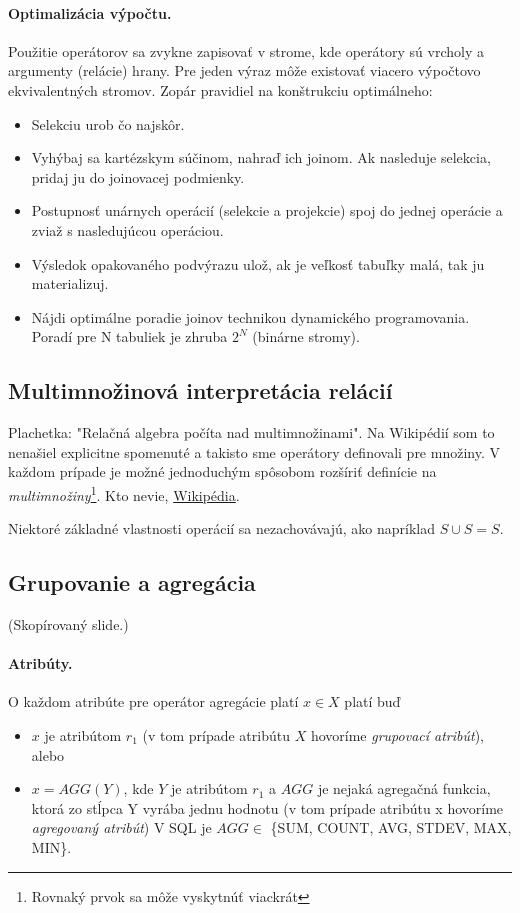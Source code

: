 \documentclass[10pt,a4paper]{article}
\begin{document}
\paragraph{Optimalizácia výpočtu.}
Použitie operátorov sa zvykne zapisovať v strome, kde operátory sú vrcholy a argumenty (relácie) hrany.
Pre jeden výraz môže existovať viacero výpočtovo ekvivalentných stromov.
Zopár pravidiel na konštrukciu optimálneho: 
\begin{itemize}
\item Selekciu urob čo najskôr.
\item Vyhýbaj sa kartézskym súčinom, nahraď ich joinom. Ak
nasleduje selekcia, pridaj ju do joinovacej podmienky.
\item Postupnosť unárnych operácií (selekcie a projekcie) spoj do
jednej operácie a zviaž s nasledujúcou operáciou.
\item Výsledok opakovaného podvýrazu ulož, ak je veľkosť tabuľky
malá, tak ju materializuj. 
\item Nájdi optimálne poradie joinov technikou dynamického
programovania. Poradí pre N tabuliek je zhruba $2^N$ (binárne stromy). 
\end{itemize}

\subsection{Multimnožinová interpretácia relácií}

Plachetka: "Relačná algebra počíta nad multimnožinami". Na Wikipédií som to nenašiel explicitne spomenuté a takisto sme operátory definovali pre množiny. V každom prípade je možné jednoduchým spôsobom rozšíriť definície na \emph{multimnožiny}\footnote{Rovnaký prvok sa môže vyskytnúť viackrát}. Kto nevie, \href{http://en.wikipedia.org/wiki/Multiset}{Wikipédia}. 

Niektoré základné vlastnosti operácií sa nezachovávajú, ako napríklad $S \cup S = S$. 

\subsection{Grupovanie a agregácia}
\label{rel_alg_agg}
(Skopírovaný slide.)

\paragraph{Atribúty.}
O každom atribúte pre operátor agregácie platí $x \in X$ platí buď 
\begin{itemize}
\item $x$ je atribútom $r_1$ (v tom prípade atribútu $X$ hovoríme
        \emph{grupovací atribút}), alebo
\item $x = AGG(Y)$, kde $Y$ je atribútom $r_1$ a $AGG$ je nejaká
     agregačná funkcia, ktorá zo stĺpca Y vyrába jednu hodnotu (v
         tom prípade atribútu x hovoríme \emph{agregovaný atribút})
V SQL je $AGG \in$ \{SUM, COUNT, AVG, STDEV, MAX, MIN\}.
\end{itemize}
\end{document}
